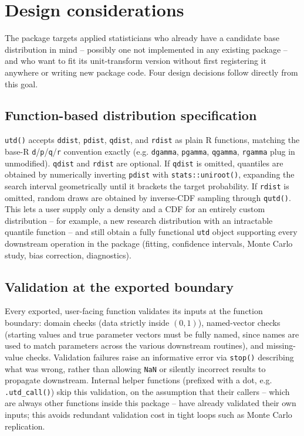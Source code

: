 \section{Design considerations}
\label{sec:design}

The package targets applied statisticians who already have a candidate
base distribution in mind -- possibly one not implemented in any
existing package -- and who want to fit its unit-transform version
without first registering it anywhere or writing new package code.
Four design decisions follow directly from this goal.

\subsection{Function-based distribution specification}

\texttt{utd()} accepts \texttt{ddist}, \texttt{pdist}, \texttt{qdist},
and \texttt{rdist} as plain R functions, matching the base-R
\texttt{d}/\texttt{p}/\texttt{q}/\texttt{r} convention exactly (e.g.
\texttt{dgamma}, \texttt{pgamma}, \texttt{qgamma}, \texttt{rgamma}
plug in unmodified). \texttt{qdist} and \texttt{rdist} are optional. If
\texttt{qdist} is omitted, quantiles are obtained by numerically
inverting \texttt{pdist} with \texttt{stats::uniroot()}, expanding the
search interval geometrically until it brackets the target probability.
If \texttt{rdist} is omitted, random draws are obtained by inverse-CDF
sampling through \texttt{qutd()}. This lets a user supply only a
density and a CDF for an entirely custom distribution -- for example, a
new research distribution with an intractable quantile function -- and
still obtain a fully functional \texttt{utd} object supporting every
downstream operation in the package (fitting, confidence intervals,
Monte Carlo study, bias correction, diagnostics).

\subsection{Validation at the exported boundary}

Every exported, user-facing function validates its inputs at the
function boundary: domain checks (data strictly inside $(0,1)$),
named-vector checks (starting values and true parameter vectors must be
fully named, since names are used to match parameters across the
various downstream routines), and missing-value checks. Validation
failures raise an informative error via \texttt{stop()} describing what
was wrong, rather than allowing \texttt{NaN} or silently incorrect
results to propagate downstream. Internal helper functions (prefixed
with a dot, e.g. \texttt{.utd\_call()}) skip this validation, on the
assumption that their callers -- which are always other functions
inside this package -- have already validated their own inputs; this
avoids redundant validation cost in tight loops such as Monte Carlo
replication.

